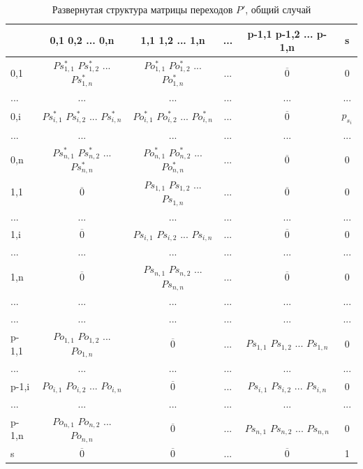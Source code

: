 \newpage 
\begin{table}[h]
	\begin{tabular}{l || c | c | c | c | c}
		& 0,1 0,2 ... 0,n & 1,1 1,2 ... 1,n & ... & p-1,1 p-1,2 ... p-1,n & s \\
		\hline \hline
		0,1 & $Ps^*_{1,1}$ $Ps^*_{1,2}$ ... $Ps^*_{1,n}$ & $Po^*_{1,1}$ $Po^*_{1,2}$ ... $Po^*_{1,n}$ & ... & $\overline 0$ & 0 \\
		... & ... & ... & ... & ... & ... \\
		0,i & $Ps^*_{i,1}$ $Ps^*_{i,2}$ ... $Ps^*_{i,n}$ & $Po^*_{i,1}$ $Po^*_{i,2}$ ... $Po^*_{i,n}$ & ... & $\overline 0$ & $p_{s_i}$ \\
		... & ... & ... & ... & ... & ... \\
		0,n & $Ps^*_{n,1}$ $Ps^*_{n,2}$ ... $Ps^*_{n,n}$ & $Po^*_{n,1}$ $Po^*_{n,2}$ ... $Po^*_{n,n}$ & ... & $\overline 0$ & 0 \\
		\hline \hline
		1,1 & $\overline 0$ & $Ps_{1,1}$ $Ps_{1,2}$ ... $Ps_{1,n}$ & ... & $\overline 0$ & 0 \\
		... & ... & ... & ... & ... & ... \\
		1,i & $\overline 0$ & $Ps_{i,1}$ $Ps_{i,2}$ ... $Ps_{i,n}$ & ... & $\overline 0$ & 0 \\
		... & ... & ... & ... & ... & ... \\
		1,n & $\overline 0$ & $Ps_{n,1}$ $Ps_{n,2}$ ... $Ps_{n,n}$ & ... & $\overline 0$ & 0 \\
		\hline \hline
		... & ... & ... & ... & ... & ... \\
		... & ... & ... & ... & ... & ... \\
		\hline \hline
		p-1,1  & $Po_{1,1}$ $Po_{1,2}$ ... $Po_{1,n}$ & $\overline 0$ & ... & $Ps_{1,1}$ $Ps_{1,2}$ ... $Ps_{1,n}$ & 0 \\
		... & ... & ... & ... & ... & ... \\
		p-1,i & $Po_{i,1}$ $Po_{i,2}$ ... $Po_{i,n}$ & $\overline 0$ & ... & $Ps_{i,1}$ $Ps_{i,2}$ ... $Ps_{i,n}$ & 0 \\
		... & ... & ... & ... & ... & ... \\
		p-1,n & $Po_{n,1}$ $Po_{n,2}$ ... $Po_{n,n}$ & $\overline 0$ & ... & $Ps_{n,1}$ $Ps_{n,2}$ ... $Ps_{n,n}$ & 0 \\
		\hline \hline
		s  & $\overline 0$ & $\overline 0$ & ... & $\overline 0$ & 1 \\
	\end{tabular}
	\caption{Развернутая структура матрицы переходов $P'$, общий случай}
	\label{tabl:comP'}
\end{table}


